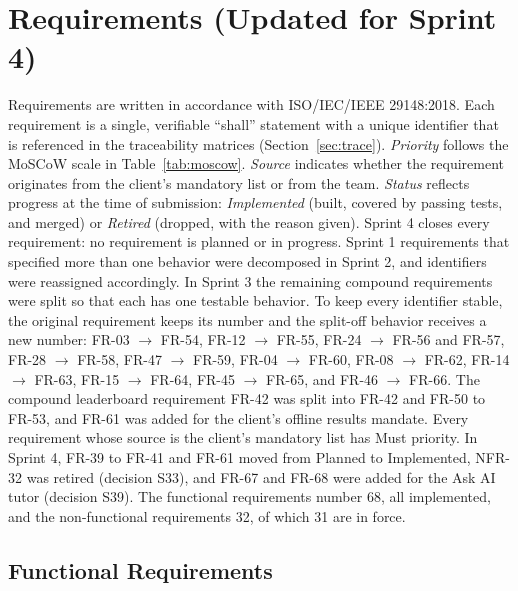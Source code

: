 \documentclass[12pt,letterpaper]{article}
\begin{document}
\section{Requirements (Updated for Sprint 4)}\label{sec:reqs}
Requirements are written in accordance with ISO/IEC/IEEE 29148:2018. Each
requirement is a single, verifiable ``shall'' statement with a unique identifier that
is referenced in the traceability matrices (Section~\ref{sec:trace}). \emph{Priority}
follows the MoSCoW scale in Table~\ref{tab:moscow}. \emph{Source} indicates whether
the requirement originates from the client's mandatory list or from the team.
\emph{Status} reflects progress at the time of submission: \emph{Implemented} (built,
covered by passing tests, and merged) or \emph{Retired} (dropped, with the reason
given). Sprint 4 closes every requirement: no requirement is planned or in progress. Sprint 1 requirements that specified
more than one behavior were decomposed in Sprint 2, and identifiers were reassigned
accordingly. In Sprint 3 the remaining compound requirements were split so that each
has one testable behavior. To keep every identifier stable, the original requirement
keeps its number and the split-off behavior receives a new number: FR-03 $\to$ FR-54,
FR-12 $\to$ FR-55, FR-24 $\to$ FR-56 and FR-57, FR-28 $\to$ FR-58, FR-47 $\to$ FR-59,
FR-04 $\to$ FR-60, FR-08 $\to$ FR-62, FR-14 $\to$ FR-63, FR-15 $\to$ FR-64,
FR-45 $\to$ FR-65, and FR-46 $\to$ FR-66. The compound leaderboard requirement FR-42
was split into FR-42 and FR-50 to FR-53, and FR-61 was added for the client's offline
results mandate. Every requirement whose source is the client's mandatory list has
Must priority. In Sprint 4, FR-39 to FR-41 and FR-61 moved from Planned to
Implemented, NFR-32 was retired (decision S33), and FR-67 and FR-68 were added for
the Ask AI tutor (decision S39). The functional requirements number 68, all
implemented, and the non-functional requirements 32, of which 31 are in force.

\subsection{Functional Requirements}
\end{document}
